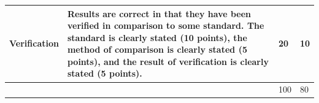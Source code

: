 \documentclass[article,12pt]{article}
\numberwithin{equation}{section}
\begin{document}
\begin{tabular}{|p{.2\linewidth}|p{.2\linewidth}|p{.2\linewidth}|p{.1\linewidth}|}
	\vspace{.2in}\textbf{Verification}        & {\tiny Results are correct in that they have been verified in comparison to some standard. The standard is clearly stated (10 points), the method of comparison is clearly stated (5 points), and the result of verification is clearly stated (5 points).}                                                                                                      & \vspace{.2in}20              &   \vspace{.2in}10   \\ \hline
	&                                                                                                                                                                                                                                                                                                                                                          & \vspace{.02in}100             &   \vspace{.02in}80     \\ \hline
\end{tabular}
\end{document}

